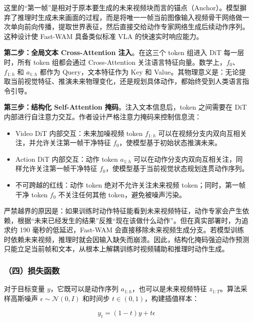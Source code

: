 这里的``第一帧''是相对于原本要生成的未来视频块而言的锚点（Anchor）。模型摒弃了推理时生成未来画面的过程，而是将唯一一帧当前图像输入视频骨干网络做一次单向前向传播，提取世界表征，然后直接交给动作专家网络生成后续动作序列。这种设计使 Fast-WAM 具备类似标准 VLA 的快速实时响应能力。

\textbf{第二步：全局文本 Cross-Attention 注入}。在这三个 token 组进入 DiT 每一层时，所有 token 组都会通过 Cross-Attention 关注语言特征向量。数学上，\(f_0\)、\(f_{1:h}\) 和 \(a_{1:h}\) 都作为 Query，文本特征作为 Key 和 Value。其物理意义是：无论提取当前视觉特征、推演未来物理变化，还是规划具体动作，都始终受到人类语言指令引导。

\textbf{第三步：结构化 Self-Attention 掩码}。注入文本信息后，token 之间需要在 DiT 内部进行自注意力交互。作者设计严格注意力掩码来控制信息流：

\begin{itemize}
\tightlist
\item
  Video DiT 内部交互：未来加噪视频 token \(f_{1:h}\) 可以在视频分支内双向互相关注，并允许关注第一帧干净特征 \(f_0\)，使模型基于初始状态推演未来。
\item
  Action DiT 内部交互：动作 token \(a_{1:h}\) 可以在动作分支内双向互相关注，同样允许关注第一帧干净特征 \(f_0\)，使模型基于当前视觉状态规划连贯动作序列。
\item
  不可跨越的红线：动作 token 绝对不允许关注未来视频 token；同时，第一帧干净 token \(f_0\) 不关注任何其他 token，避免被噪声污染。
\end{itemize}

严禁越界的原因是：如果训练时动作特征能看到未来视频特征，动作专家会产生依赖，根据``未来已经发生的结果''反推``现在该做什么动作''。但在真实部署时，为追求约 190 毫秒的低延迟，Fast-WAM 会直接移除未来视频生成分支。若模型训练时依赖未来视频，推理时就会因输入缺失而崩溃。因此，结构化掩码强迫动作预测只能立足当前帧和文本，从根本上解耦训练时视频辅助和推理时动作生成。

\hypertarget{ux56dbux635fux5931ux51fdux6570-3}{%
\subsubsection{（四）损失函数}\label{ux56dbux635fux5931ux51fdux6570-3}}

对于目标变量 \(y\)，它既可以是动作序列 \(a_{1:h}\)，也可以是未来视频特征 \(z_{1:T}\)。算法采样高斯噪声 \(\epsilon \sim \mathcal{N}(0,I)\) 和时间步 \(t \in (0,1)\)，构建插值样本：

\[
y_t = (1-t)y + t\epsilon
\]

